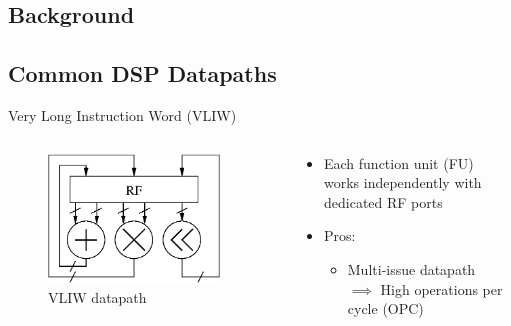 \documentclass[handout]{beamer}
\begin{document}
\begin{CJK}{UTF8}{bkai}
            \section{Background}
            \subsection{Common DSP Datapaths}
            \begin{frame}{Very Long Instruction Word (VLIW)}
                \begin{columns}
                    \begin{column}{0.4\textwidth}
                        \begin{figure}[!ht]
                            \centering
                            \includegraphics[width=0.9\textwidth]{./figs/vliw.eps}
                            \caption{VLIW datapath}
                        \end{figure}
                    \end{column}
                    \begin{column}{0.6\textwidth}
                        \begin{itemize}
                            \item <2-> {Each function unit (FU) works independently with dedicated RF ports
                                }
                            \item <3-> {Pros:
                                    \begin{itemize}
                                        \item Multi-issue datapath \\ $\implies$ High operations per cycle (OPC)

\end{itemize}}
\end{itemize}
\end{column}
\end{columns}
\end{frame}
\end{CJK}
\end{document}
